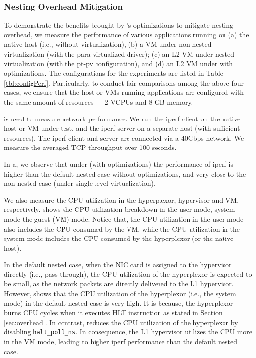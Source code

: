 \subsubsection{Nesting Overhead Mitigation}
To demonstrate the benefits brought by \arch's optimizations to mitigate nesting overhead, we measure the performance of various applications running on (a) the native host (i.e., without virtualization), (b) a VM under non-nested virtualization (with the para-virtualized driver); (c) an L2 VM under nested virtualization (with the pt-pv configuration), and (d) an L2 VM under \arch with optimizations. The configurations for the experiments are listed in Table \ref{tbl:configPerf}. Particularly, to conduct fair comparisons among the above four cases, we ensure that the host or VMs running applications are configured with the same amount of resources --- 2 VCPUs and 8 GB memory. 

 \cite{iperf} is used to measure network performance. We run the iperf client on the native host or VM under test, and the iperf server on a separate host (with sufficient resources). The iperf client and server are connected via a 40Gbps network. We measure the averaged TCP throughput over 100 seconds. 

In a, we observe that under \arch (with optimizations) the performance of iperf is higher than the default nested case without optimizations, and very close to the non-nested case (under single-level virtualization). 

We also measure the CPU utilization in the hyperplexor, hypervisor and VM, respectively.  shows the CPU utilization breakdown in the user mode, system mode the guest (VM) mode. Notice that, the CPU utilization in the user mode also includes the CPU consumed by the VM, while the CPU utilization in the system mode includes the CPU consumed by the hyperplexor (or the native host).

In the default nested case, when the NIC card is assigned to the hypervisor directly (i.e., pass-through), the CPU utilization of the hyperplexor is expected to be small, as the network packets are directly delivered to the L1 hypervisor. However,  shows that the CPU utilization of the hyperplexor (i.e., the system mode) in the default nested case is very high. It is because, the hyperplexor burns CPU cycles when it executes HLT instruction as stated in Section \ref{sec:overhead}. In contrast, \arch reduces the CPU utilization of the hyperplexor by disabling \texttt{halt\_poll\_ns}. In consequence, the L1 hypervisor utilizes the CPU more in the VM mode, leading to higher iperf performance than the default nested case. 

